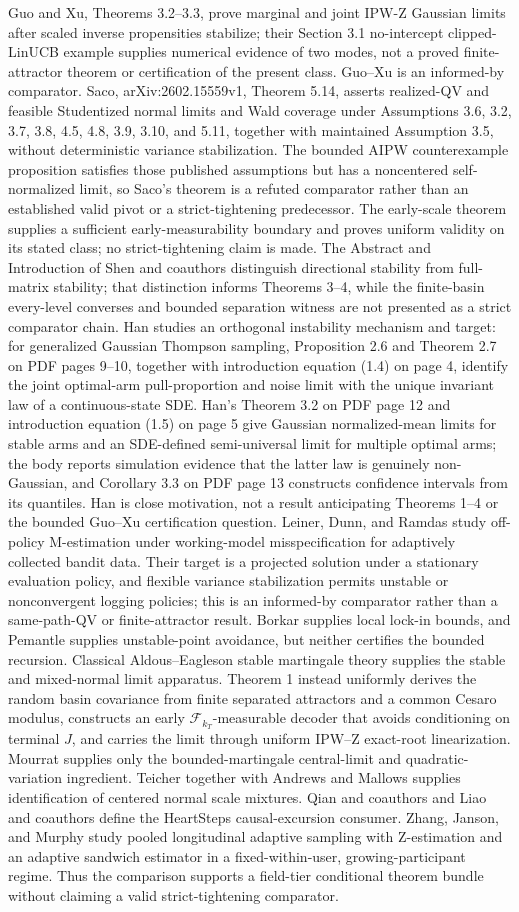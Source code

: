 Guo and Xu, Theorems 3.2--3.3, prove marginal and joint IPW-Z Gaussian limits after scaled inverse propensities stabilize; their Section 3.1 no-intercept clipped-LinUCB example supplies numerical evidence of two modes, not a proved finite-attractor theorem or certification of the present class. Guo--Xu is an informed-by comparator. Saco, arXiv:2602.15559v1, Theorem 5.14, asserts realized-QV and feasible Studentized normal limits and Wald coverage under Assumptions 3.6, 3.2, 3.7, 3.8, 4.5, 4.8, 3.9, 3.10, and 5.11, together with maintained Assumption 3.5, without deterministic variance stabilization. The bounded AIPW counterexample proposition satisfies those published assumptions but has a noncentered self-normalized limit, so Saco's theorem is a refuted comparator rather than an established valid pivot or a strict-tightening predecessor. The early-scale theorem supplies a sufficient early-measurability boundary and proves uniform validity on its stated class; no strict-tightening claim is made. The Abstract and Introduction of Shen and coauthors distinguish directional stability from full-matrix stability; that distinction informs Theorems 3--4, while the finite-basin every-level converses and bounded separation witness are not presented as a strict comparator chain. Han studies an orthogonal instability mechanism and target: for generalized Gaussian Thompson sampling, Proposition 2.6 and Theorem 2.7 on PDF pages 9--10, together with introduction equation (1.4) on page 4, identify the joint optimal-arm pull-proportion and noise limit with the unique invariant law of a continuous-state SDE. Han's Theorem 3.2 on PDF page 12 and introduction equation (1.5) on page 5 give Gaussian normalized-mean limits for stable arms and an SDE-defined semi-universal limit for multiple optimal arms; the body reports simulation evidence that the latter law is genuinely non-Gaussian, and Corollary 3.3 on PDF page 13 constructs confidence intervals from its quantiles. Han is close motivation, not a result anticipating Theorems 1--4 or the bounded Guo--Xu certification question. Leiner, Dunn, and Ramdas study off-policy M-estimation under working-model misspecification for adaptively collected bandit data. Their target is a projected solution under a stationary evaluation policy, and flexible variance stabilization permits unstable or nonconvergent logging policies; this is an informed-by comparator rather than a same-path-QV or finite-attractor result. Borkar supplies local lock-in bounds, and Pemantle supplies unstable-point avoidance, but neither certifies the bounded recursion. Classical Aldous--Eagleson stable martingale theory supplies the stable and mixed-normal limit apparatus. Theorem 1 instead uniformly derives the random basin covariance from finite separated attractors and a common Cesaro modulus, constructs an early \(\mathcal F_{k_T}\)-measurable decoder that avoids conditioning on terminal \(J\), and carries the limit through uniform IPW--Z exact-root linearization. Mourrat supplies only the bounded-martingale central-limit and quadratic-variation ingredient. Teicher together with Andrews and Mallows supplies identification of centered normal scale mixtures. Qian and coauthors and Liao and coauthors define the HeartSteps causal-excursion consumer. Zhang, Janson, and Murphy study pooled longitudinal adaptive sampling with Z-estimation and an adaptive sandwich estimator in a fixed-within-user, growing-participant regime. Thus the comparison supports a field-tier conditional theorem bundle without claiming a valid strict-tightening comparator.